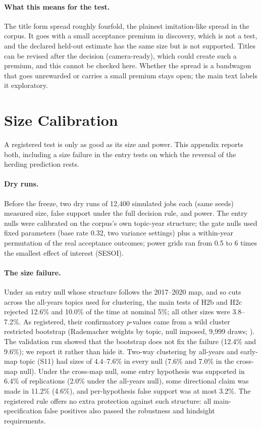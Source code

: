 \paragraph{What this means for the test.} The title form spread roughly fourfold, the plainest imitation-like
spread in the corpus. It goes with a small acceptance premium in discovery, which is not a test, and the declared
held-out estimate has the same size but is not supported. Titles can be revised after the decision (camera-ready),
which could create such a premium, and this cannot be checked here. Whether the spread is a bandwagon that goes
unrewarded \citep{abrahamson1993institutional} or carries a small premium stays open; the main text labels it
exploratory.

\FloatBarrier
\section{Size Calibration}\label{app:size}

A registered test is only as good as its size and power. This appendix reports both, including a size failure in the
entry tests on which the reversal of the herding prediction rests.

\paragraph{Dry runs.} Before the freeze, two dry runs of 12,400 simulated jobs each (same seeds) measured size, false
support under the full decision rule, and power. The entry nulls were calibrated on the corpus's own topic-year
structure; the gate nulls used fixed parameters (base rate 0.32, two variance settings) plus a within-year
permutation of the real acceptance outcomes; power grids ran from 0.5 to 6 times the smallest effect of interest
(SESOI).

\paragraph{The size failure.} Under an entry null whose structure follows the 2017--2020 map, and so cuts across the
all-years topics used for clustering, the main tests of H2b and H2c rejected 12.6\% and 10.0\% of the time at nominal
5\%; all other sizes were 3.8--7.2\%. As registered, their confirmatory $p$-values came from a wild cluster
restricted bootstrap (Rademacher weights by topic, null imposed, 9,999 draws; \citealp{cameron2008bootstrap}). The
validation run showed that the bootstrap does not fix the failure (12.4\% and 9.6\%); we report it rather than hide
it. Two-way clustering by all-years and early-map topic (S11) had sizes of 4.4--7.6\% in every null (7.6\% and 7.0\%
in the cross-map null). Under the cross-map null, some entry hypothesis was supported in 6.4\% of replications (2.0\%
under the all-years null), some directional claim was made in 11.2\% (4.6\%), and per-hypothesis false support was at
most 3.2\%. The registered rule offers no extra protection against such structure: all main-specification false
positives also passed the robustness and hindsight requirements.

